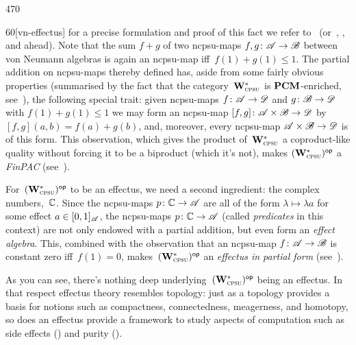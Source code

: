 \begin{parsec}{470}
\begin{point}{60}[vn-effectus]
for a precise formulation and proof of this fact
we refer to~\cite{effintro,kentapartial}
(or~, 
, and  ahead).
Note that the sum $f+g$ of two ncpsu-maps
$f,g\colon \mathscr{A}\to\mathscr{B}$ between von Neumann algebras
is again an ncpsu-map
iff~$f(1)+g(1)\leq 1$.
The partial addition on ncpsu-maps
thereby defined
has, aside from some fairly obvious properties
(summarised by the
fact that the category~$\mathbf{W}^*_{\text{\textsc{cpsu}}}$
    is $\mathbf{PCM}$-enriched, see~\cite{kentapartial}),
the following special trait:
given ncpsu-maps $f\colon \mathscr{A}\to\mathscr{D}$
and $g\colon \mathscr{B}\to\mathscr{D}$
with $f(1)+g(1)\leq 1$
we may form an ncpsu-map $[f,g]\colon \mathscr{A}\times \mathscr{B}\to \mathscr{D}$
by $[f,g](a,b)=f(a)+g(b)$,
and, moreover,
every ncpsu-map $\mathscr{A}\times\mathscr{B}\to\mathscr{D}$ is of this form.
This observation, which gives the product of~$\mathbf{W}^*_{\text{\textsc{cpsu}}}$ a coproduct-like quality
without forcing it to be a biproduct (which it's not),
	makes ${(\mathbf{W}^*_{\text{\textsc{cpsu}}})}{^{\mathsf{op}}}$ a \emph{FinPAC} 
	(see~).

	For~${(\mathbf{W}^*_{\text{\textsc{cpsu}}})}{^{\mathsf{op}}}$ to be an effectus,
we need a second ingredient:
 the complex numbers,~$\mathbb{C}$.
Since the ncpsu-maps $p\colon \mathbb{C}\to \mathscr{A}$
are all of the form $\lambda \mapsto \lambda a$
for some effect $a\in [0,1]_{\mathscr{A}}$,
the ncpsu-maps $p\colon \mathbb{C}\to\mathscr{A}$
(called \emph{predicates} in this context)
are not only endowed with a partial addition,
but even form an \emph{effect algebra}.
This,
combined with the observation that
an ncpsu-map $f\colon \mathscr{A}\to\mathscr{B}$
is constant zero iff~$f(1)=0$,
makes~${(\mathbf{W}^*_{\text{\textsc{cpsu}}})}{^{\mathsf{op}}}$
an \emph{effectus in partial form} (see~).

As you can see, there's nothing deep underlying~${(\mathbf{W}^*_{\text{\textsc{cpsu}}})}{^{\mathsf{op}}}$
being an effectus.
In that respect effectus theory resembles topology:
just as a topology 
provides a basis for  
notions such as compactness, connectedness, meagerness, and homotopy,
so does an
effectus provide a framework to study
 aspects of  computation
such as side effects () and purity
().
\end{point}
\end{parsec}
